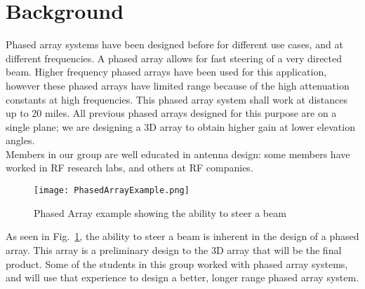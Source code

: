 \documentclass[UROP.tex]{subfiles}
\begin{document}
\bigskip
\section{\Large Background}
	Phased array systems have been designed before for different use cases, and at different frequencies.  A phased array allows for fast steering of a very directed beam.  Higher frequency phased arrays have been used for this application, however these phased arrays have limited range because of the high attenuation constants at high frequencies.  This phased array system shall work at distances up to 20 miles.  All previous phased arrays designed for this purpose are on a single plane; we are designing a 3D array to obtain higher gain at lower elevation angles. \\
	
	Members in our group are well educated in antenna design: some members have worked in RF research labs, and others at RF companies.  
	
\begin{figure}[H]
\centering
	\texttt{[image: PhasedArrayExample.png]}
	\caption{ Phased Array example showing the ability to steer a beam\label{fig:PAexample}}
\end{figure}
	
	As seen in Fig.~\ref{fig:PAexample}, the ability to steer a beam is inherent in the design of a phased array.  This array is a preliminary design to the 3D array that will be the final product.  Some of the students in this group worked with phased array systems, and will use that experience to design a better, longer range phased array system.  
\end{document}
